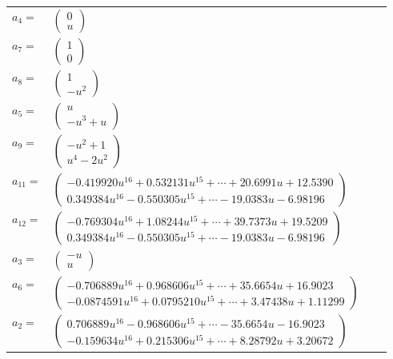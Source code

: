 \documentclass[1p]{elsarticle_modified}
\theoremstyle{definition}
\begin{document}
\begin{tabular}{m{7pt} m{180pt} m{7pt} m{180pt} }
\flushright $a_{4}=$&$\begin{pmatrix}0\\u\end{pmatrix}$ \\
\flushright $a_{7}=$&$\begin{pmatrix}1\\0\end{pmatrix}$ \\
\flushright $a_{8}=$&$\begin{pmatrix}1\\- u^2\end{pmatrix}$ \\
\flushright $a_{5}=$&$\begin{pmatrix}u\\- u^3+u\end{pmatrix}$ \\
\flushright $a_{9}=$&$\begin{pmatrix}- u^2+1\\u^4-2 u^2\end{pmatrix}$ \\
\flushright $a_{11}=$&$\begin{pmatrix}-0.419920 u^{16}+0.532131 u^{15}+\cdots+20.6991 u+12.5390\\0.349384 u^{16}-0.550305 u^{15}+\cdots-19.0383 u-6.98196\end{pmatrix}$ \\
\flushright $a_{12}=$&$\begin{pmatrix}-0.769304 u^{16}+1.08244 u^{15}+\cdots+39.7373 u+19.5209\\0.349384 u^{16}-0.550305 u^{15}+\cdots-19.0383 u-6.98196\end{pmatrix}$ \\
\flushright $a_{3}=$&$\begin{pmatrix}- u\\u\end{pmatrix}$ \\
\flushright $a_{6}=$&$\begin{pmatrix}-0.706889 u^{16}+0.968606 u^{15}+\cdots+35.6654 u+16.9023\\-0.0874591 u^{16}+0.0795210 u^{15}+\cdots+3.47438 u+1.11299\end{pmatrix}$ \\
\flushright $a_{2}=$&$\begin{pmatrix}0.706889 u^{16}-0.968606 u^{15}+\cdots-35.6654 u-16.9023\\-0.159634 u^{16}+0.215306 u^{15}+\cdots+8.28792 u+3.20672\end{pmatrix}$ \\

\end{tabular}
\end{document}

